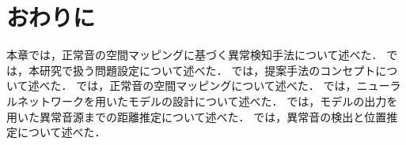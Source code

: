 \documentclass[../main]{subfiles}
\begin{document}
\section{おわりに}
\label{sec:pmethod_conclusion}

本章では，正常音の空間マッピングに基づく異常検知手法について述べた．
では，本研究で扱う問題設定について述べた．
では，提案手法のコンセプトについて述べた．
では，正常音の空間マッピングについて述べた．
では，ニューラルネットワークを用いたモデルの設計について述べた．
では，モデルの出力を用いた異常音源までの距離推定について述べた．
では，異常音の検出と位置推定について述べた．
\end{document}
